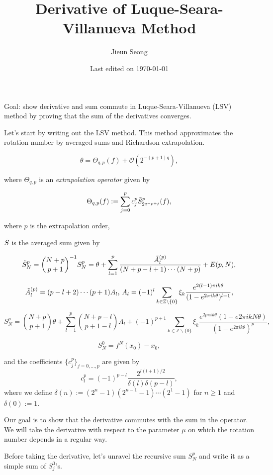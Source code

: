 \documentclass[12pt]{article}
\title{Derivative of Luque-Seara-Villanueva Method}
\author{Jieun Seong}
\date{Last edited on \today}
\newcommand{\Z}{\mathbb{Z}}
\begin{document}

Goal: show derivative and sum commute in Luque-Seara-Villanueva (LSV) method by proving that the sum of the derivatives converges. 

\vspace{0.3in}

Let's start by writing out the LSV method. This method approximates the rotation number by averaged sums and Richardson extrapolation. 

$$\theta = \Theta_{q,p}(f)+\mathcal{O}(2^{-(p+1)q}),$$

where $\Theta_{q,p}$ is an \textit{extrapolation operator} given by 

$$\Theta_{q,p}(f) := \sum_{j=0}^{p} c_j^p \Tilde{S}_{2^{q-p+j}}^{p}(f),$$ 

where $p$ is the extrapolation order,

$\Tilde{S}$ is the averaged sum given by

$$\Tilde{S}_N^p = {N+p \choose p+1}^{-1} S_N^p = \theta + \sum_{l=1}^{p} \frac{\Tilde{A}_l^{(p)}}{(N+p-l+1)\cdots(N+p)} + E(p,N),$$

$$\Tilde{A}_l^{(p)} = (p-l+2)\cdots(p+1)A_l \text{, } A_l = (-1)^l \sum_{k\in\Z\backslash\{0\}} \xi_k \frac{e^{2(l-1)\pi i k \theta}}{(1-e^{2\pi i k \theta})^{l-1}}, $$

$$S_N^p = {N+p \choose p+1} \theta + \sum_{l=1}^p {N+p-l \choose p+1-l} A_l + (-1)^{p+1} \sum_{k\in\Z\backslash\{0\}}\xi_k \frac{e^{2p\pi i k\theta}(1-e{2\pi i kN \theta})}{(1-e^{2\pi i k \theta})^p}, $$ 

$$S_N^0 = f^N(x_0)-x_0,$$

and the coefficients $\{c_j^p\}_{j=0,...,p}$ are given by 
$$c_l^p = (-1)^{p-l} \frac{2^{l(l+1)/2}}{\delta(l)\delta(p-l)},$$
where we define $\delta(n) := (2^n-1)(2^{n-1}-1)\cdots(2^1-1)$ for $n\geq1$ and $\delta(0):=1$.

Our goal is to show that the derivative commutes with the sum in the operator. We will take the derivative with respect to the parameter $\mu$ on which the rotation number depends in a regular way.

Before taking the derivative, let's unravel the recursive sum $S_N^p$ and write it as a simple sum of $S_j^0$'s. 
\end{document}
